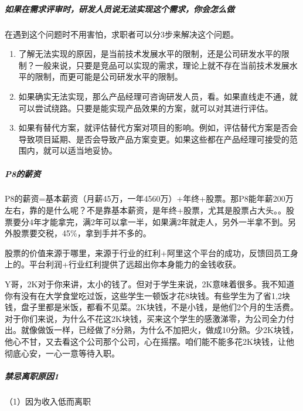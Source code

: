 \documentclass[letterpaper,10pt,english]{sphinxmanual}
\begin{document}
\subparagraph{如果在需求评审时，研发人员说无法实现这个需求，你会怎么做}
\label{\detokenize{chapter_interview/HR:id7}}
在遇到这个问题时不用害怕，求职者可以分3步来解决这个问题。
\begin{enumerate}
%
\item {} 
了解无法实现的原因，是当前技术发展水平的限制，还是公司研发水平的限制？一般来说，只要是竞品可以实现的需求，理论上就不存在当前技术发展水平的限制，而更可能是公司研发水平的限制。

\item {} 
如果确实无法实现，那么产品经理可咨询研发人员，看。如果直线走不通，就可以尝试绕路。只要是能实现产品效果的方案，就可以对其进行评估。

\item {} 
如果有替代方案，就评估替代方案对项目的影响。例如，评估替代方案是否会导致项目延期、是否会导致产品方案变更。如果这些都在产品经理可接受的范围内，就可以适当地妥协。

\end{enumerate}


\subparagraph{P8的薪资}
\label{\detokenize{chapter_interview/HR:p8}}
P8的薪资=基本薪资（月薪4\sphinxhyphen{}5万，一年45\sphinxhyphen{}60万）+年终+股票。那P8能年薪200万左右，靠的是什么呢？不是靠基本薪资，是年终+股票，尤其是股票占大头。。股票要分4年才能拿完，满2年可以拿一半，如果满2年就走人，另外一半拿不到。另外股票要交税，45\%，拿到手并不多的。

股票的价值来源于哪里，来源于行业的红利+阿里这个平台的成功，反馈回员工身上的。平台利润+行业红利提供了远超出你本身能力的金钱收获。

Y哥，2K对于你来讲，太小的钱了。但对于学生来说，2K意味着很多。我不知道你有没有在大学食堂吃过饭，这些学生一顿饭才花8块钱。有些学生为了省1,2块钱，盘子里都是米饭，都看不见菜。2K块钱，不是小钱，是他们2个月的生活费。对于你们来说，为什么不花这2K块钱，买来这个学生的感激涕零，为公司全力付出。就像做饭一样，已经做了8分熟，为什么不加把火，做成10分熟。少2K块钱，他心不甘，又去看这个公司那个公司，心在摇摆。咱们能不能多花2K块钱，让他彻底心安，一心一意等待入职。%
\begin{footnote}[892]\sphinxAtStartFootnote
{}
%
\end{footnote}


\subparagraph{禁忌离职原因1\sphinxfootnotemark[893]}
\label{\detokenize{chapter_interview/HR:id8}}%
\begin{footnotetext}[893]\sphinxAtStartFootnote
{}
%
\end{footnotetext}\ignorespaces 
（1）因为收入低而离职
\end{document}
